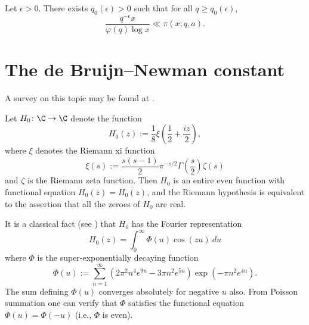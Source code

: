 \begin{theorem}
Let $\epsilon>0$. There exists $q_0(\epsilon)>0$ such that for all $q\geq q_0(\epsilon)$,
$$\frac{q^{-\epsilon}x}{\varphi(q)\log x}\ll\pi(x;q,a).$$
\end{theorem}


\chapter{The de Bruijn--Newman constant}\label{debruijn-newman-chapter}

A survey on this topic may be found at \cite{newman-wu-survey}.

Let $H_0 \colon \C \to \C$ denote the function
\begin{equation}\label{hoz}
 H_0(z) := \frac{1}{8} \xi\left(\frac{1}{2} + \frac{iz}{2}\right),
\end{equation}
where $\xi$ denotes the Riemann xi function
\begin{equation}\label{sas}
 \xi(s) := \frac{s(s-1)}{2} \pi^{-s/2} \Gamma\left(\frac{s}{2}\right) \zeta(s)
\end{equation}
and $\zeta$ is the Riemann zeta function.
Then $H_0$ is an entire even function with functional equation $H_0(\overline{z}) = \overline{H_0(z)}$, and the Riemann hypothesis is equivalent to the assertion that all the zeroes of $H_0$ are real.

It is a classical fact (see \cite[p. 255]{titchmarsh_theory_1986}) that $H_0$ has the Fourier representation
$$ H_0(z) = \int_0^\infty \Phi(u) \cos(zu)\ du$$
where $\Phi$ is the super-exponentially decaying function
\begin{equation}\label{phidef}
 \Phi(u) := \sum_{n=1}^\infty (2\pi^2  n^4 e^{9u} - 3\pi n^2 e^{5u} ) \exp(-\pi n^2 e^{4u} ).
\end{equation}
The sum defining $\Phi(u)$ converges absolutely for negative $u$ also.  From Poisson summation one can verify that $\Phi$ satisfies the functional equation $\Phi(u) = \Phi(-u)$ (i.e., $\Phi$ is even).

